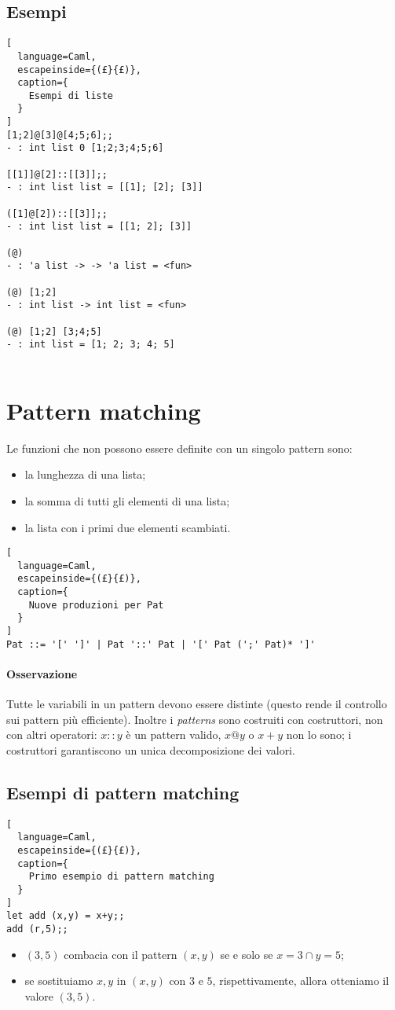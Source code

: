 \subsection{Esempi}
\begin{lstlisting}[
  language=Caml,
  escapeinside={(£}{£)},
  caption={
    Esempi di liste
  }
]
[1;2]@[3]@[4;5;6];;
- : int list 0 [1;2;3;4;5;6]

[[1]]@[2]::[[3]];;
- : int list list = [[1]; [2]; [3]]

([1]@[2])::[[3]];;
- : int list list = [[1; 2]; [3]] 

(@)
- : 'a list -> -> 'a list = <fun>

(@) [1;2]
- : int list -> int list = <fun>

(@) [1;2] [3;4;5]
- : int list = [1; 2; 3; 4; 5]


\end{lstlisting}

\section{Pattern matching}
Le funzioni che non possono essere definite con un singolo pattern sono:
\begin{itemize}
  \item la lunghezza di una lista;
  \item la somma di tutti gli elementi di una lista;
  \item la lista con i primi due elementi scambiati.
\end{itemize}

\begin{lstlisting}[
  language=Caml,
  escapeinside={(£}{£)},
  caption={
    Nuove produzioni per Pat
  }
]
Pat ::= '[' ']' | Pat '::' Pat | '[' Pat (';' Pat)* ']'
\end{lstlisting}

\paragraph{Osservazione}
Tutte le variabili in un pattern devono essere distinte (questo
rende il controllo sui pattern più efficiente).
Inoltre i \emph{patterns} sono costruiti con costruttori, non con
altri operatori:
$x::y$ è un pattern valido, $x@y$ o $x+y$ non lo sono; i costruttori
garantiscono un unica decomposizione dei valori.

\subsection{Esempi di pattern matching}
\begin{lstlisting}[
  language=Caml,
  escapeinside={(£}{£)},
  caption={
    Primo esempio di pattern matching
  }
]
let add (x,y) = x+y;;
add (r,5);;
\end{lstlisting}
\begin{itemize}
  \item $(3,5)$ combacia con il pattern $(x,y)$ se e solo se $x=3\cap
    y=5$;
  \item se sostituiamo $x,y$ in $(x,y)$ con $3$ e $5$,
    rispettivamente, allora otteniamo il valore $(3,5)$.
\end{itemize}


